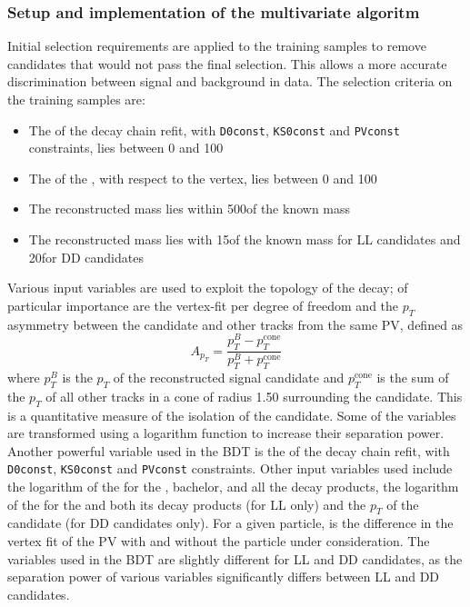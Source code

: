 \subsubsection{Setup and implementation of the multivariate algoritm}

Initial selection requirements are applied to the training samples to remove candidates that would not pass the final selection. This allows a more accurate discrimination between signal and background in data. The selection criteria on the training samples are:

\begin{itemize}
\item The \chisq of the decay chain refit, with {\tt D0const}, {\tt KS0const} and {\tt PVconst} constraints, lies between 0 and 100
\item The \chisqip of the \B, with respect to the \B vertex, lies between 0 and 100
\item The reconstructed \Kstarpm mass lies within 500\mev of the known \Kstar mass
\item The reconstructed \KS mass lies with 15\mev of the known \KS mass for LL candidates and 20\mev for DD candidates
\end{itemize}

Various input variables are used to exploit the topology of the decay; of particular importance are the \Bm vertex-fit \chisq per degree of freedom and the $p_T$ asymmetry between the \Bm candidate and other tracks from the same PV, defined as
\begin{equation}
A_{p_T} = \frac{p_T^B - p_T^{\text{cone}}}{p_T^B + p_T^{\text{cone}}}
\end{equation}
where $p_T^B$ is the $p_T$ of the reconstructed \Bm signal candidate and $p_T^{\text{cone}}$ is the sum of the $p_T$ of all other tracks in a cone of radius 1.50 surrounding the \Bm candidate. This is a quantitative measure of the isolation of the \Bm candidate. Some of the variables are transformed using a logarithm function to increase their separation power. Another powerful variable used in the BDT is the \chisq of the decay chain refit, with {\tt D0const}, {\tt KS0const} and {\tt PVconst} constraints. Other input variables used include the logarithm of the \chisqip for the \B, bachelor, \D and all the \D decay products, the logarithm of the \chisqip for the \KS and both its decay products (for LL only) and the $p_T$ of the \KS candidate (for DD candidates only). For a given particle, \chisqip is the difference in the vertex fit \chisq of the PV with and without the particle under consideration. The variables used in the BDT are slightly different for LL and DD candidates, as the separation power of various \KS variables significantly differs between LL and DD candidates. 

